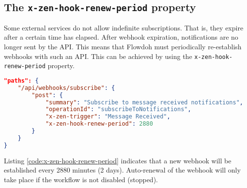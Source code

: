 \subsection{The \texttt{x-zen-hook-renew-period} property}
Some external services do not allow indefinite subscriptions. That is, they expire after a certain time has elapsed. After webhook expiration, notifications are no longer sent by the API. This means that Flowdoh must periodically re-establish webhooks with such an API. This can be achieved by using the \texttt{x-zen-hook-renew-period} property.
\begin{lstlisting}[caption={\texttt{x-zen-hook-renew-period} usage},label={code:x-zen-hook-renew-period},language=json]
"paths": {
    "/api/webhooks/subscribe": {
        "post": {
            "summary": "Subscribe to message received notifications",
            "operationId": "subscribeToNotifications",
            "x-zen-trigger": "Message Received",
            "x-zen-hook-renew-period": 2880
        }
    }
}
\end{lstlisting}
Listing \ref{code:x-zen-hook-renew-period} indicates that a new webhook will be established every 2880 minutes (2 days). Auto-renewal of the webhook will only take place if the workflow is not disabled (stopped).